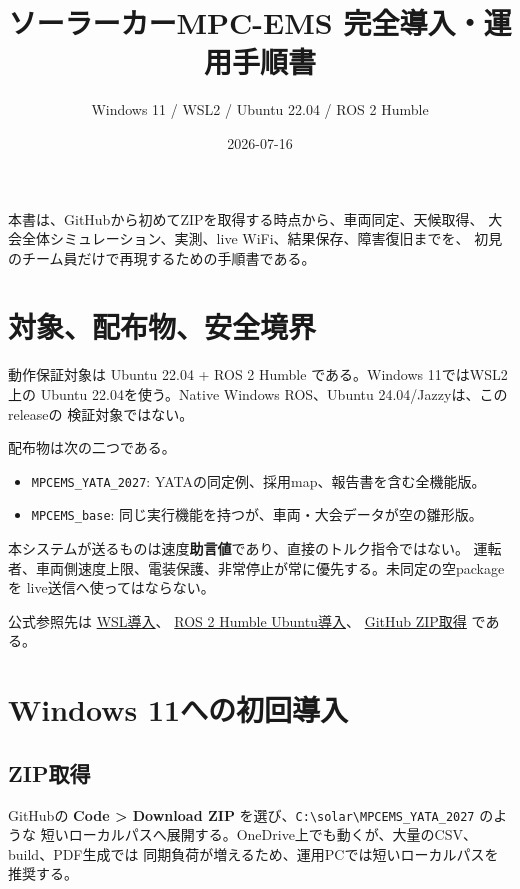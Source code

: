 \documentclass[
  japanese,
  a4paper,
]{article}
\title{ソーラーカーMPC-EMS 完全導入・運用手順書}
\subtitle{Windows 11 / WSL2 / Ubuntu 22.04 / ROS 2 Humble}
\author{}
\date{2026-07-16}
\providecommand{\tightlist}{%
  \setlength{\itemsep}{0pt}\setlength{\parskip}{0pt}}
\begin{document}
\maketitle

{
\setcounter{tocdepth}{3}
\tableofcontents
}
本書は、GitHubから初めてZIPを取得する時点から、車両同定、天候取得、
大会全体シミュレーション、実測、live WiFi、結果保存、障害復旧までを、
初見のチーム員だけで再現するための手順書である。

\section{対象、配布物、安全境界}\label{ux5bfeux8c61ux914dux5e03ux7269ux5b89ux5168ux5883ux754c}

動作保証対象は Ubuntu 22.04 + ROS 2 Humble である。Windows
11ではWSL2上の Ubuntu 22.04を使う。Native Windows ROS、Ubuntu
24.04/Jazzyは、このreleaseの 検証対象ではない。

配布物は次の二つである。

\begin{itemize}
\tightlist
\item
  \texttt{MPCEMS\_YATA\_2027}:
  YATAの同定例、採用map、報告書を含む全機能版。
\item
  \texttt{MPCEMS\_base}:
  同じ実行機能を持つが、車両・大会データが空の雛形版。
\end{itemize}

本システムが送るものは速度\textbf{助言値}であり、直接のトルク指令ではない。
運転者、車両側速度上限、電装保護、非常停止が常に優先する。未同定の空packageを
live送信へ使ってはならない。

公式参照先は
\href{https://learn.microsoft.com/windows/wsl/install}{WSL導入}、
\href{https://docs.ros.org/en/humble/Installation/Ubuntu-Install-Debians.html}{ROS
2 Humble Ubuntu導入}、
\href{https://docs.github.com/repositories/working-with-files/using-files/downloading-source-code-archives}{GitHub
ZIP取得} である。

\section{Windows
11への初回導入}\label{windows-11ux3078ux306eux521dux56deux5c0eux5165}

\subsection{ZIP取得}\label{zipux53d6ux5f97}

GitHubの \textbf{Code \textgreater{} Download ZIP}
を選び、\texttt{C:\textbackslash{}solar\textbackslash{}MPCEMS\_YATA\_2027}
のような
短いローカルパスへ展開する。OneDrive上でも動くが、大量のCSV、build、PDF生成では
同期負荷が増えるため、運用PCでは短いローカルパスを推奨する。
\end{document}
